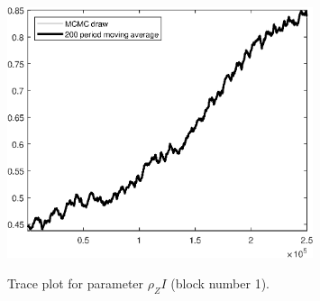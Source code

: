 \begin{figure}[H]
\centering
  \includegraphics[width=0.8\textwidth]{BRS_est_shopping/graphs/TracePlot_rho_ZI_blck_1}\\
    \caption{Trace plot for parameter ${\rho_ZI}$ (block number 1).}
\end{figure}
